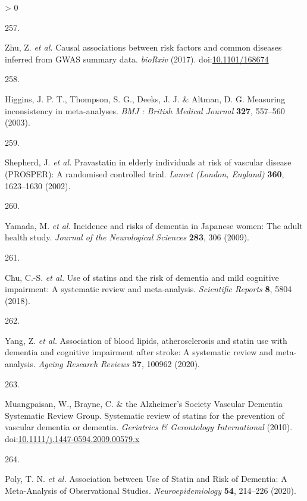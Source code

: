 \documentclass[a4paper, twoside]{templates/ociamthesis}
\newlength{\cslhangindent}
\newlength{\csllabelwidth}
\newenvironment{CSLReferences}[3] %
 {%
  \setlength{\parindent}{0pt}
  \ifodd #1 \everypar{\setlength{\hangindent}{\cslhangindent}}\ignorespaces\fi
  \ifnum #2 > 0
  \setlength{\parskip}{#2\baselineskip}
  \fi
 }%
 {}
\newcommand{\CSLLeftMargin}[1]{\parbox[t]{\maxof{\widthof{#1}}{\csllabelwidth}}{#1}}
\newcommand{\CSLRightInline}[1]{\parbox[t]{\linewidth - \csllabelwidth}{#1}}
\begin{document}
\begin{CSLReferences}{0}{0}
\leavevmode\hypertarget{ref-zhu2017}{}%
\CSLLeftMargin{257. }
\CSLRightInline{Zhu, Z. \emph{et al.} Causal associations between risk factors and common diseases inferred from {GWAS} summary data. \emph{bioRxiv} (2017). doi:\href{https://doi.org/10.1101/168674}{10.1101/168674}}

\leavevmode\hypertarget{ref-higgins2003}{}%
\CSLLeftMargin{258. }
\CSLRightInline{Higgins, J. P. T., Thompson, S. G., Deeks, J. J. \& Altman, D. G. Measuring inconsistency in meta-analyses. \emph{BMJ : British Medical Journal} \textbf{327}, 557--560 (2003).}

\leavevmode\hypertarget{ref-shepherd2002}{}%
\CSLLeftMargin{259. }
\CSLRightInline{Shepherd, J. \emph{et al.} Pravastatin in elderly individuals at risk of vascular disease ({PROSPER}): A randomised controlled trial. \emph{Lancet (London, England)} \textbf{360}, 1623--1630 (2002).}

\leavevmode\hypertarget{ref-yamada2009conf}{}%
\CSLLeftMargin{260. }
\CSLRightInline{Yamada, M. \emph{et al.} Incidence and risks of dementia in {Japanese} women: The adult health study. \emph{Journal of the Neurological Sciences} \textbf{283}, 306 (2009).}

\leavevmode\hypertarget{ref-chu2018}{}%
\CSLLeftMargin{261. }
\CSLRightInline{Chu, C.-S. \emph{et al.} Use of statins and the risk of dementia and mild cognitive impairment: A systematic review and meta-analysis. \emph{Scientific Reports} \textbf{8}, 5804 (2018).}

\leavevmode\hypertarget{ref-yang2020}{}%
\CSLLeftMargin{262. }
\CSLRightInline{Yang, Z. \emph{et al.} Association of blood lipids, atherosclerosis and statin use with dementia and cognitive impairment after stroke: A systematic review and meta-analysis. \emph{Ageing Research Reviews} \textbf{57}, 100962 (2020).}

\leavevmode\hypertarget{ref-muangpaisan2010}{}%
\CSLLeftMargin{263. }
\CSLRightInline{Muangpaisan, W., Brayne, C. \& the Alzheimer's Society Vascular Dementia Systematic Review Group. Systematic review of statins for the prevention of vascular dementia or dementia. \emph{Geriatrics \& Gerontology International} (2010). doi:\href{https://doi.org/10.1111/j.1447-0594.2009.00579.x}{10.1111/j.1447-0594.2009.00579.x}}

\leavevmode\hypertarget{ref-poly2020}{}%
\CSLLeftMargin{264. }
\CSLRightInline{Poly, T. N. \emph{et al.} Association between {Use} of {Statin} and {Risk} of {Dementia}: A {Meta}-{Analysis} of {Observational Studies}. \emph{Neuroepidemiology} \textbf{54}, 214--226 (2020).}


\end{CSLReferences}
\end{document}
